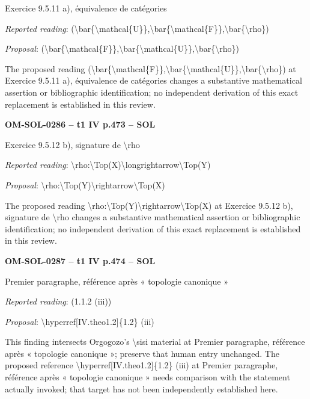 Exercice 9.5.11 a), équivalence de catégories\par
\emph{Reported reading}: (\textbackslash{}bar\{\textbackslash{}mathcal\{U\}\},\textbackslash{}bar\{\textbackslash{}mathcal\{F\}\},\textbackslash{}bar\{\textbackslash{}rho\})\par
\emph{Proposal}: (\textbackslash{}bar\{\textbackslash{}mathcal\{F\}\},\textbackslash{}bar\{\textbackslash{}mathcal\{U\}\},\textbackslash{}bar\{\textbackslash{}rho\})\par
The proposed reading (\textbackslash{}bar\{\textbackslash{}mathcal\{F\}\},\textbackslash{}bar\{\textbackslash{}mathcal\{U\}\},\textbackslash{}bar\{\textbackslash{}rho\}) at Exercice 9.5.11 a), équivalence de catégories changes a substantive mathematical assertion or bibliographic identification; no independent derivation of this exact replacement is established in this review.\par
\par\noindent\textbf{OM-SOL-0286 -- t1 IV p.473 -- SOL}\par
Exercice 9.5.12 b), signature de \textbackslash{}rho\par
\emph{Reported reading}: \textbackslash{}rho:\textbackslash{}Top(X)\textbackslash{}longrightarrow\textbackslash{}Top(Y)\par
\emph{Proposal}: \textbackslash{}rho:\textbackslash{}Top(Y)\textbackslash{}rightarrow\textbackslash{}Top(X)\par
The proposed reading \textbackslash{}rho:\textbackslash{}Top(Y)\textbackslash{}rightarrow\textbackslash{}Top(X) at Exercice 9.5.12 b), signature de \textbackslash{}rho changes a substantive mathematical assertion or bibliographic identification; no independent derivation of this exact replacement is established in this review.\par
\par\noindent\textbf{OM-SOL-0287 -- t1 IV p.474 -- SOL}\par
Premier paragraphe, référence après « topologie canonique »\par
\emph{Reported reading}: (1.1.2 (iii))\par
\emph{Proposal}: \textbackslash{}hyperref[IV.theo1.2]\{1.2\} (iii)\par
This finding intersects Orgogozo's \textbackslash{}sisi material at Premier paragraphe, référence après « topologie canonique »; preserve that human entry unchanged. The proposed reference \textbackslash{}hyperref[IV.theo1.2]\{1.2\} (iii) at Premier paragraphe, référence après « topologie canonique » needs comparison with the statement actually invoked; that target has not been independently established here.\par
